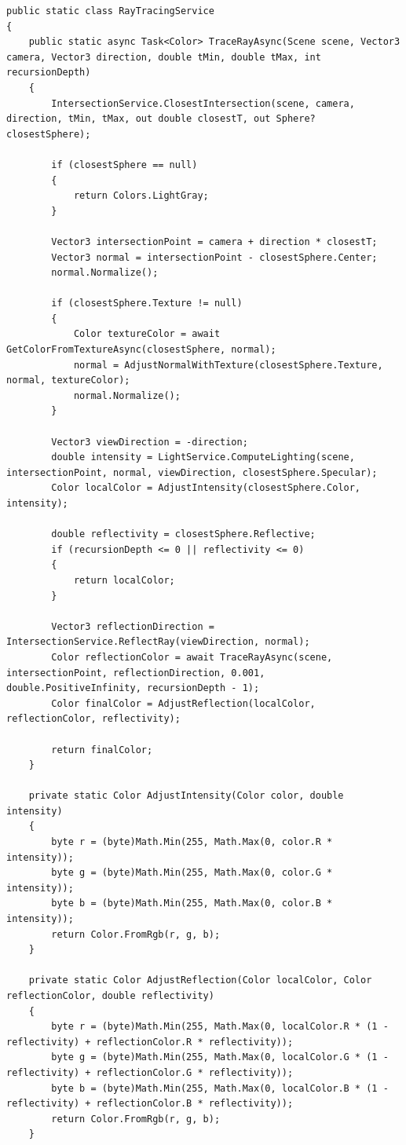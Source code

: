\begin{lstlisting}[caption={Класс RayTracingService}, label={lst:3-5}]
public static class RayTracingService
{
	public static async Task<Color> TraceRayAsync(Scene scene, Vector3 camera, Vector3 direction, double tMin, double tMax, int recursionDepth)
	{
		IntersectionService.ClosestIntersection(scene, camera, direction, tMin, tMax, out double closestT, out Sphere? closestSphere);
		
		if (closestSphere == null)
		{
			return Colors.LightGray;
		}
		
		Vector3 intersectionPoint = camera + direction * closestT;
		Vector3 normal = intersectionPoint - closestSphere.Center;
		normal.Normalize();
		
		if (closestSphere.Texture != null)
		{
			Color textureColor = await GetColorFromTextureAsync(closestSphere, normal);
			normal = AdjustNormalWithTexture(closestSphere.Texture, normal, textureColor);
			normal.Normalize();
		}
		
		Vector3 viewDirection = -direction;
		double intensity = LightService.ComputeLighting(scene, intersectionPoint, normal, viewDirection, closestSphere.Specular);
		Color localColor = AdjustIntensity(closestSphere.Color, intensity);
		
		double reflectivity = closestSphere.Reflective;
		if (recursionDepth <= 0 || reflectivity <= 0)
		{
			return localColor;
		}
		
		Vector3 reflectionDirection = IntersectionService.ReflectRay(viewDirection, normal);
		Color reflectionColor = await TraceRayAsync(scene, intersectionPoint, reflectionDirection, 0.001, double.PositiveInfinity, recursionDepth - 1);
		Color finalColor = AdjustReflection(localColor, reflectionColor, reflectivity);
		
		return finalColor;
	}
	
	private static Color AdjustIntensity(Color color, double intensity)
	{
		byte r = (byte)Math.Min(255, Math.Max(0, color.R * intensity));
		byte g = (byte)Math.Min(255, Math.Max(0, color.G * intensity));
		byte b = (byte)Math.Min(255, Math.Max(0, color.B * intensity));
		return Color.FromRgb(r, g, b);
	}
	
	private static Color AdjustReflection(Color localColor, Color reflectionColor, double reflectivity)
	{
		byte r = (byte)Math.Min(255, Math.Max(0, localColor.R * (1 - reflectivity) + reflectionColor.R * reflectivity));
		byte g = (byte)Math.Min(255, Math.Max(0, localColor.G * (1 - reflectivity) + reflectionColor.G * reflectivity));
		byte b = (byte)Math.Min(255, Math.Max(0, localColor.B * (1 - reflectivity) + reflectionColor.B * reflectivity));
		return Color.FromRgb(r, g, b);
	}
	

\end{lstlisting}
